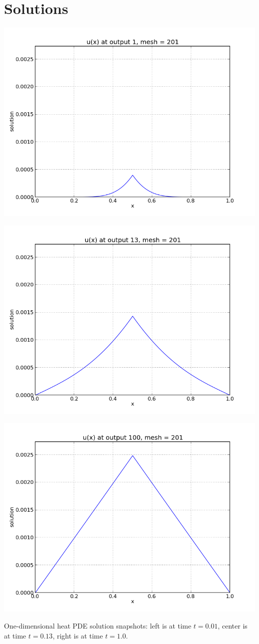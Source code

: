 \documentclass[letterpaper,10pt,english]{sphinxmanual}
\begin{document}
\section{Solutions}
\label{ark_heat1D:solutions}
\includegraphics[width=0.300\linewidth]{plot-ark_heat1d_1.png}

\includegraphics[width=0.300\linewidth]{plot-ark_heat1d_2.png}

\includegraphics[width=0.300\linewidth]{plot-ark_heat1d_3.png}

One-dimensional heat PDE solution snapshots: left is at time $t=0.01$,
center is at time $t=0.13$, right is at time $t=1.0$.
\end{document}
